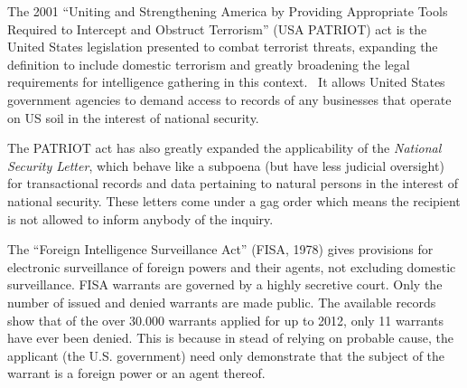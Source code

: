 \documentclass[11pt, a4paper]{article}
\begin{document}
The 2001 ``Uniting and Strengthening America by Providing Appropriate Tools Required to Intercept and Obstruct Terrorism'' (USA PATRIOT) act is the United States legislation presented to combat terrorist threats, expanding the definition to include domestic terrorism and greatly broadening the legal requirements for intelligence gathering in this context.~\cite{mailman2002uniting}
It allows United States government agencies to demand access to records of any businesses that operate on US soil in the interest of national security.

The PATRIOT act has also greatly expanded the applicability of the \textit{National Security Letter}, which behave like a subpoena (but have less judicial oversight) for transactional records and data pertaining to natural persons in the interest of national security.
These letters come under a gag order which means the recipient is not allowed to inform anybody of the inquiry.

The ``Foreign Intelligence Surveillance Act'' (FISA, 1978) gives provisions for electronic surveillance of foreign powers and their agents, not excluding domestic surveillance.
FISA warrants are governed by a highly secretive court. Only the number of issued and denied warrants are made public.
The available records show that of the over 30.000 warrants applied for up to 2012, only 11 warrants have ever been denied.
This is because in stead of relying on probable cause, the applicant (the U.S. government) need only demonstrate that the subject of the warrant is a foreign power or an agent thereof.


\end{document}
